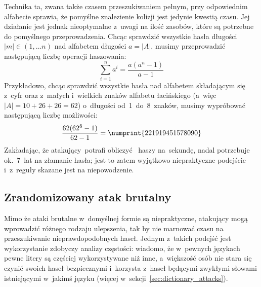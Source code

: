 Technika ta, zwana także czasem przeszukiwaniem pełnym, przy odpowiednim
alfabecie sprawia, że pomyślne znalezienie kolizji jest jedynie kwestią czasu.
Jej działanie jest jednak nieoptymalne z~uwagi na ilość zasobów, które są
potrzebne do pomyślnego przeprowadzenia. Chcąc sprawdzić wszystkie hasła
długości \mbox{$|m| \in (1, \ldots n)$} nad alfabetem długości $a=|A|$, musimy
przeprowadzić następującą liczbę operacji haszowania:
    $$\sum_{i=1}^n a^i = \frac{a(a^n-1)}{a-1}$$
Przykładowo, chcąc sprawdzić wszystkie hasła nad alfabetem składającym się
z~cyfr oraz z~małych i~wielkich znaków alfabetu łacińskiego (a~więc $|A| =
10+26+26 = 62$) o~długości od~1~do~8~znaków, musimy wypróbować następującą
liczbę możliwości:
    $$\frac{62(62^8-1)}{62-1} = \numprint{221919451578090}$$
Zakładając, że atakujący~potrafi obliczyć ~haszy na~sekundę,
nadal potrzebuje ok.~7~lat na złamanie hasła; jest to zatem wyjątkowo
niepraktyczne podejście i~z~reguły skazane jest na niepowodzenie.



\subsection{Zrandomizowany atak brutalny}
Mimo że ataki brutalne w~domyślnej formie są niepraktyczne, atakujący mogą
wprowadzić różnego rodzaju ulepszenia, tak by nie marnować czasu na
przeszukiwanie nieprawdopodobnych haseł. Jednym z~takich podejść jest
wykorzystanie zdobyczy analizy częstości: wiadomo, że w~pewnych językach pewne
litery są częściej wykorzystywane niż inne, a~większość osób nie stara się
czynić swoich haseł bezpiecznymi i~korzysta z~haseł będącymi zwykłymi słowami
istniejącymi w~jakimś języku (więcej w~sekcji~\ref{sec:dictionary_attacks}).

